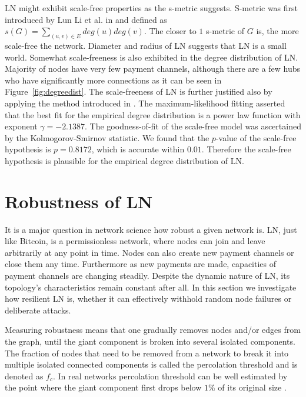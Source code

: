 \documentclass[runningheads]{llncs}
\begin{document}
LN might exhibit scale-free properties as the s-metric suggests. S-metric was first introduced by Lun Li et al. in \cite{li2005towards} and defined as $s(G)=\sum_{(u,v)\in E}deg(u)deg(v)$. The closer to $1$  s-metric of $G$ is, the more scale-free the network. Diameter and radius of LN suggests that LN is a small world. Somewhat scale-freeness is also exhibited in the degree distribution of LN. Majority of nodes have very few payment channels, although there are a few hubs who have significantly more connections as it can be seen in Figure~\ref{fig:degreedist}. The scale-freeness of LN is further justified also by applying the method introduced in \cite{clauset2009power}. The maximum-likelihood fitting asserted that the best fit for the empirical degree distribution is a power law function with exponent $\gamma=-2.1387$. The goodness-of-fit of the scale-free model was ascertained by the Kolmogorov-Smirnov statistic. We found that the $p$-value of the scale-free hypothesis is $p=0.8172$, which is accurate within $0.01$. Therefore the scale-free hypothesis is plausible for the empirical degree distribution of LN.

\section{Robustness of LN}
It is a major question in network science how robust a given network is. LN, just like Bitcoin, is a permissionless network, where nodes can join and leave arbitrarily at any point in time. Nodes can also create new payment channels or close them any time. Furthermore as new payments are made, capacities of payment channels are changing steadily. Despite the dynamic nature of LN, its topology's characteristics remain constant after all.
In this section we investigate how resilient LN is, whether it can effectively withhold random node failures or deliberate attacks.

Measuring robustness means that one gradually removes nodes and/or edges from the graph, until the giant component is broken into several isolated components. The fraction of nodes that need to be removed from a network to break it into multiple isolated connected components is called the percolation threshold and is denoted as $f_c$. In real networks percolation threshold can be well estimated by the point where the giant component first drops below $1\%$ of its original size \cite{barabasi2016network}.
\end{document}
